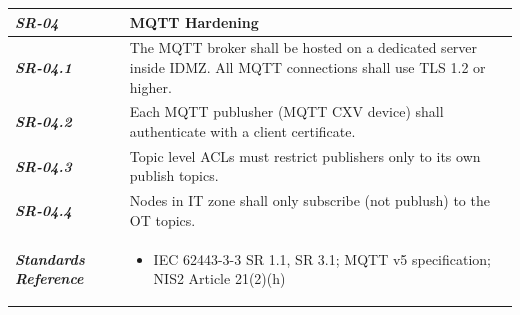\documentclass{article}
\begin{document}
\begin{tabularx}{\textwidth}{>{\bfseries}p{2.5cm} X}
    \textit{SR-04} & \textbf{MQTT Hardening} \vspace{0.5em}\\
\toprule
\textit{SR-04.1} &
    The MQTT broker shall be hosted on a dedicated server inside IDMZ. All MQTT connections shall use TLS 1.2 or higher.
    \vspace{0.5em}
\\
\textit{SR-04.2} &
    Each MQTT publusher (MQTT CXV device) shall authenticate with a client certificate.
    \vspace{0.5em}
    \\
\textit{SR-04.3} &
    Topic level ACLs must restrict publishers only to its own publish topics.
    \vspace{0.5em}
    \\
\textit{SR-04.4} &
    Nodes in IT zone shall only subscribe (not publush) to the OT topics.
    \vspace{0.5em}
    \\
\midrule
    \textit{Standards Reference} &
\begin{itemize}[label=-, noitemsep, topsep=0pt, leftmargin=*]
    \item IEC 62443-3-3 SR 1.1, SR 3.1; MQTT v5 specification; NIS2 Article 21(2)(h)
\end{itemize} \vspace{1em} \\ 
\end{tabularx}
\vspace{2em}
\end{document}
